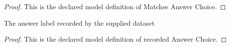 \begin{proof}
  This is the declared model definition of Matches Answer Choice.
\end{proof}
\begin{definition}
  \label{def:physics:phyx-mini-0198:phyxminiproblems-problemphyxmini0198-recordedanswerchoice}
  The answer label recorded by the supplied dataset
\end{definition}
\begin{proof}
  This is the declared model definition of recorded Answer Choice.
\end{proof}
